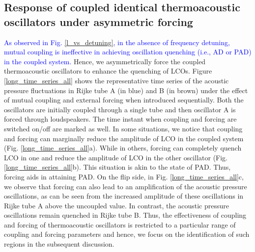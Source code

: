 \documentclass[%
preprint,
 amsmath,amssymb,
 aps,
 pra,
]{revtex4-2}
\begin{document}
\subsection{Response of coupled identical thermoacoustic oscillators under asymmetric forcing}
\label{Results:3}
\textcolor{blue}{As observed in Fig. \ref{l_vs_detuning}, in the absence of frequency detuning, mutual coupling is ineffective in achieving oscillation quenching (i.e., AD or PAD) in the coupled system.} Hence, we asymmetrically force the coupled thermoacoustic oscillators to enhance the quenching of LCOs. Figure \ref{long_time_series_all} shows the representative time series of the acoustic pressure fluctuations in Rijke tube A (in blue) and B (in brown) under the effect of mutual coupling and external forcing when introduced sequentially. Both the oscillators are initially coupled through a single tube and then oscillator A is forced through loudspeakers. The time instant when coupling and forcing are switched on/off are marked as well. In some situations, we notice that coupling and forcing can marginally reduce the amplitude of LCO in the coupled system (Fig. \ref{long_time_series_all}a). While in others, forcing can completely quench LCO in one and reduce the amplitude of LCO in the other oscillator (Fig. \ref{long_time_series_all}b). This situation is akin to the state of PAD. Thus, forcing aids in attaining PAD. On the flip side, in Fig. \ref{long_time_series_all}c, we observe that forcing can also lead to an amplification of the acoustic pressure oscillations, as can be seen from the increased amplitude of these oscillations in Rijke tube A above the uncoupled value. In contrast, the acoustic pressure oscillations remain quenched in Rijke tube B. Thus, the effectiveness of coupling and forcing of thermoacoustic oscillators is restricted to a particular range of coupling and forcing parameters and hence, we focus on the identification of such regions in the subsequent discussion.
\end{document}
